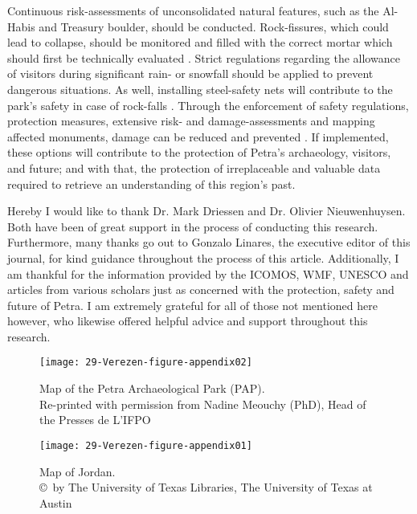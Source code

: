 Continuous risk-assessments of unconsolidated natural features, such as the Al-Habis and Treasury boulder, should be conducted.
Rock-fissures, which could lead to collapse, should be monitored and filled with
the correct mortar which should first be technically evaluated \parencite[926--932]{alsaad2001}.
Strict regulations regarding the allowance of visitors during significant rain- or snowfall should be applied to prevent dangerous situations.
As well, installing steel-safety nets  will contribute to the park’s safety in case of
rock-falls \parencite[2617--2639]{volkwein2011}.
Through the enforcement of safety regulations, protection measures, extensive risk- and damage-assessments and mapping affected monuments,
damage can be reduced and prevented \parencites[127]{alshawabkehy2010}[441--446]{delmonaco2013}.
If implemented, these options will contribute to the protection of Petra’s archaeology, visitors, and future;
and with that, the protection of irreplaceable and valuable data required to retrieve an understanding of this region’s past.

Hereby  I would like to thank Dr. Mark Driessen and Dr. Olivier Nieuwenhuysen. Both have been of great support in the process of conducting this research. Furthermore, many thanks go out to Gonzalo Linares, the executive editor of this journal, for kind guidance throughout the process of this article. Additionally, I am thankful for the information provided by the ICOMOS, WMF, UNESCO and articles from various scholars just as concerned with the protection, safety and future of Petra. I am extremely grateful for all of those not mentioned here however, who likewise offered helpful advice and support throughout this research.

\begin{figure}[!htb]
	\texttt{[image: 29-Verezen-figure-appendix02]}
	\caption{Map of the Petra Archaeological Park (PAP).
		{\normalfont\scriptsize \\ Re-printed with permission from Nadine Meouchy (PhD), Head of the Presses de L’IFPO
	}}
	\label{fig:29-Verezen-figure-appendix02}
\end{figure}

\begin{figure}[!htb]
	\texttt{[image: 29-Verezen-figure-appendix01]}
	\caption{Map of Jordan.
		{\normalfont\scriptsize \\ \copyright\ by The University of Texas Libraries, The University of Texas at Austin
	}}
	\label{fig:29-Verezen-figure-appendix01}
\end{figure}



\clearpage
\IJSRAclosing%